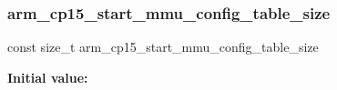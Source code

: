 \subsubsection{\texorpdfstring{arm\_cp15\_start\_mmu\_config\_table\_size}{arm\_cp15\_start\_mmu\_config\_table\_size}}
{\footnotesize\ttfamily const size\+\_\+t arm\+\_\+cp15\+\_\+start\+\_\+mmu\+\_\+config\+\_\+table\+\_\+size}

{\bfseries Initial value\+:}
\begin{DoxyCode}{0}
\DoxyCodeLine{=}

\end{DoxyCode}
